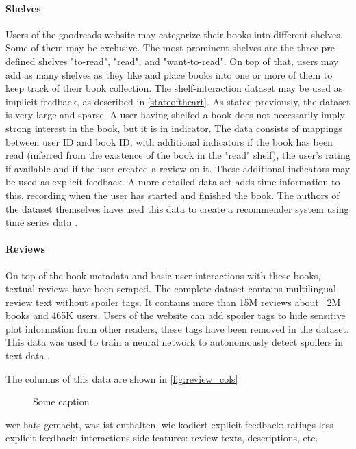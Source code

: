 \documentclass[10pt,draft,journal,a4paper,oneside,twocolumn]{IEEEtran}
\begin{document}
\paragraph{Shelves}
Users of the goodreads website may categorize their books into different shelves. Some of them may be exclusive. The most prominent shelves are the three pre-defined shelves "to-read", "read", and "want-to-read". On top of that, users may add as many shelves as they like and place books into one or more of them to keep track of their book collection.
The shelf-interaction dataset may be used as implicit feedback, as described in \autoref{stateoftheart}. As stated previously, the dataset is very large and sparse. A user having shelfed a book does not necessarily imply strong interest in the book, but it is in indicator. 
The data consists of mappings between user ID and book ID, with additional indicators if the book has been read (inferred from the existence of the book in the "read" shelf), the user's rating if available and if the user created a review on it. These additional indicators may be used as explicit feedback.
A more detailed data set adds time information to this, recording when the user has started and finished the book. The authors of the dataset themselves have used this data to create a recommender system using time series data \cite{Pera.2018}.

\paragraph{Reviews}
On top of the book metadata and basic user interactions with these books, textual reviews have been scraped. The complete dataset contains multilingual review text without spoiler tags. It contains more than 15M reviews about ~2M books and 465K users. Users of the website can add spoiler tags to hide sensitive plot information from other readers, these tags have been removed in the dataset. This data was used to train a neural network to autonomously detect spoilers in text data \cite{Wan.2019}.

The columns of this data are shown in \autoref{fig:review_cols}


\begin{figure}[h]
    \centering
    \caption{Some caption}
    \label{fig:review_cols}
\end{figure}
wer hats gemacht, was ist enthalten, wie kodiert
explicit feedback: ratings
less explicit feedback: interactions
side features: review texts, descriptions, etc.
\end{document}
